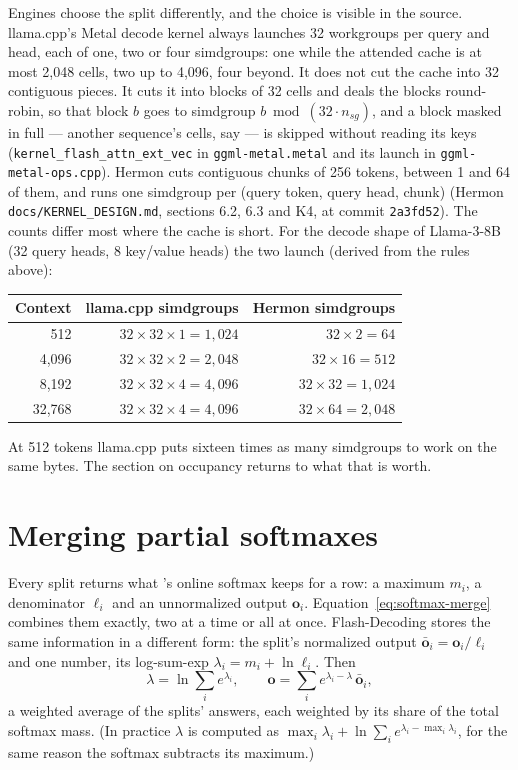 Engines choose the split differently, and the choice is visible in the source.
llama.cpp's Metal decode kernel always launches 32 workgroups per query and
head, each of one, two or four simdgroups: one while the attended cache is at
most 2,048 cells, two up to 4,096, four beyond. It does not cut the cache into
32 contiguous pieces. It cuts it into blocks of 32 cells and deals the blocks
round-robin, so that block $b$ goes to simdgroup $b \bmod (32 \cdot n_{sg})$,
and a block masked in full --- another sequence's cells, say --- is skipped
without reading its keys (\texttt{kernel\_flash\_attn\_ext\_vec} in
\texttt{ggml-metal.metal} and its launch in \texttt{ggml-metal-ops.cpp}). Hermon
cuts contiguous chunks of 256 tokens, between 1 and 64 of them, and runs one
simdgroup per (query token, query head, chunk) (Hermon
\texttt{docs/KERNEL\_DESIGN.md}, sections 6.2, 6.3 and K4, at commit
\texttt{2a3fd52}). The counts differ most where the cache is short. For the
decode shape of Llama-3-8B (32 query heads, 8 key/value heads) the two launch
(derived from the rules above):

\begin{center}\small
\begin{tabular}{@{}rrr@{}}
\toprule
Context & llama.cpp simdgroups & Hermon simdgroups \\
\midrule
512 & $32 \times 32 \times 1 = 1{,}024$ & $32 \times 2 = 64$ \\
4,096 & $32 \times 32 \times 2 = 2{,}048$ & $32 \times 16 = 512$ \\
8,192 & $32 \times 32 \times 4 = 4{,}096$ & $32 \times 32 = 1{,}024$ \\
32,768 & $32 \times 32 \times 4 = 4{,}096$ & $32 \times 64 = 2{,}048$ \\
\bottomrule
\end{tabular}
\end{center}

\noindent At 512 tokens llama.cpp puts sixteen times as many simdgroups to work
on the same bytes. The section on occupancy returns to what that is worth.

\section{Merging partial softmaxes}

Every split returns what 's online softmax keeps for a
row: a maximum $m_i$, a denominator $\ell_i$ and an unnormalized output
$\mathbf{o}_i$. Equation~\eqref{eq:softmax-merge} combines them exactly, two at
a time or all at once. Flash-Decoding stores the same information in a
different form: the split's normalized output $\bar{\mathbf{o}}_i =
\mathbf{o}_i/\ell_i$ and one number, its log-sum-exp $\lambda_i = m_i + \ln
\ell_i$. Then
\begin{equation}
\lambda = \ln \sum_i e^{\lambda_i},\qquad
\mathbf{o} = \sum_i e^{\lambda_i - \lambda}\,\bar{\mathbf{o}}_i ,
\label{eq:lse-combine}
\end{equation}
a weighted average of the splits' answers, each weighted by its share of the
total softmax mass. (In practice $\lambda$ is computed as
$\max_i \lambda_i + \ln \sum_i e^{\lambda_i - \max_i \lambda_i}$, for the same
reason the softmax subtracts its maximum.)

